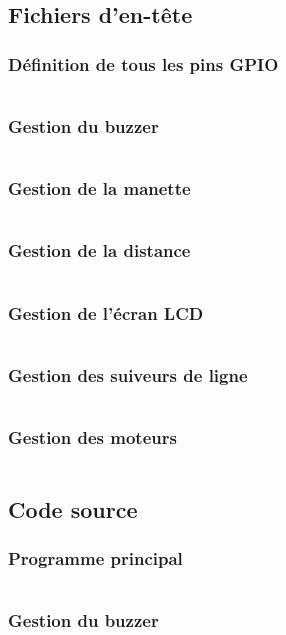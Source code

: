 \subsection{Fichiers d'en-tête}
    \subsubsection{Définition de tous les pins GPIO}
        \inputminted[breaklines]{c}{code/include/gpioPins.h}
    \subsubsection{Gestion du buzzer}
        \inputminted[breaklines]{c}{code/include/buzzer.h}
    \subsubsection{Gestion de la manette}
        \inputminted[breaklines]{c}{code/include/controller.h}
    \subsubsection{Gestion de la distance}
        \inputminted[breaklines]{c}{code/include/distance.h}
    \subsubsection{Gestion de l'écran LCD}
        \inputminted[breaklines]{c}{code/include/i2cLCD.h}
    \subsubsection{Gestion des suiveurs de ligne}
        \inputminted[breaklines]{c}{code/include/lineFinder.h}
    \subsubsection{Gestion des moteurs}
        \inputminted[breaklines]{c}{code/include/motors.h}
\subsection{Code source}
    \subsubsection{Programme principal}
        \inputminted[breaklines]{c}{code/src/main.c}
    \subsubsection{Gestion du buzzer}
        \inputminted[breaklines]{c}{code/src/buzzer.c}
